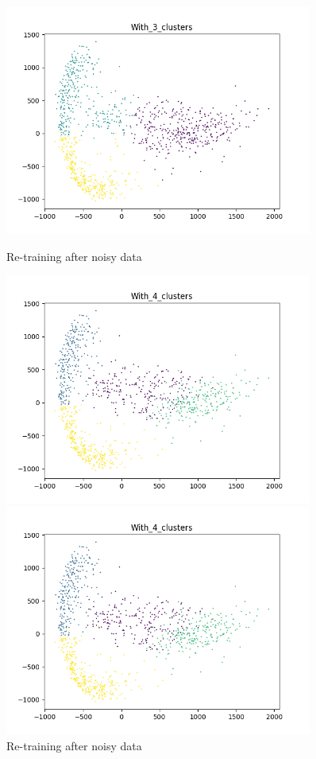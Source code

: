 \documentclass[11pt]{article}
\begin{document}
\begin{enumerate}
\begin{enumerate}
\begin{figure}[h!]
\begin{minipage}{0.45\textwidth}
         \includegraphics[width=0.9\textwidth]{With_3_clusters}
         \caption{Re-training after noisy data}
    \end{minipage}\hfill
    \begin{minipage}{0.45\textwidth}
    	\centering
         \includegraphics[width=0.9\textwidth]{With_4_clusters}
         \caption{Re-training after noisy data}
    \end{minipage}\hfill
    \begin{minipage}{0.45\textwidth}
    	\centering
         \includegraphics[width=0.9\textwidth]{With_4_clusters}

\end{minipage}
\end{figure}
\end{enumerate}
\end{enumerate}
\end{document}
